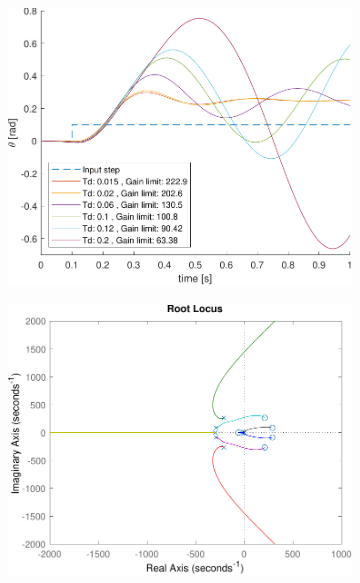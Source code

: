 \begin{figure}[t!]
\begin{subfigure}{0.5\linewidth}
		\centering
		\includegraphics[width=0.85\linewidth]{../code/stretch/figs/TdPlot}
		\caption{}
		\label{fig:stretch_td}
	\end{subfigure}\hfill
	\caption{Confronto della risposta al variare del guadagno (a) o del delay (b). Si vede come al crescere del guadagno la risposta diventa oscillatore pur riducendosi il valore dell'angolo di equilibrio. Al crescere del tempo di ritardo aumenta il tempo necessario a raggiungere l'equilibrio e si abbassa il valore limite di guadagno, quindi è possibile che, a parità di valore di $\beta$ aumentando $T_d$ il sistema diventi instabile.}
		\vspace{0.5cm}
	\begin{subfigure}{0.5\linewidth}
		\centering
		\includegraphics[width=0.85\linewidth]{../code/stretch/figs/rootlocus}
		\caption{}
		\label{fig:rootlocus_stretch}
	\end{subfigure}\hfill

\end{figure}
